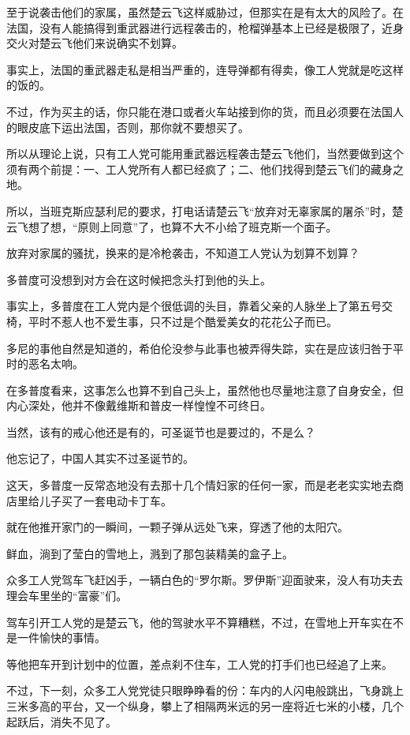 至于说袭击他们的家属，虽然楚云飞这样威胁过，但那实在是有太大的风险了。在法国，没有人能搞得到重武器进行远程袭击的，枪榴弹基本上已经是极限了，近身交火对楚云飞他们来说确实不划算。

事实上，法国的重武器走私是相当严重的，连导弹都有得卖，像工人党就是吃这样的饭的。

不过，作为买主的话，你只能在港口或者火车站接到你的货，而且必须要在法国人的眼皮底下运出法国，否则，那你就不要想买了。

所以从理论上说，只有工人党可能用重武器远程袭击楚云飞他们，当然要做到这个须有两个前提：一、工人党所有人都已经疯了；二、他们找得到楚云飞们的藏身之地。

所以，当班克斯应瑟利尼的要求，打电话请楚云飞“放弃对无辜家属的屠杀”时，楚云飞想了想，“原则上同意”了，也算不大不小给了班克斯一个面子。

放弃对家属的骚扰，换来的是冷枪袭击，不知道工人党认为划算不划算？

多普度可没想到对方会在这时候把念头打到他的头上。

事实上，多普度在工人党内是个很低调的头目，靠着父亲的人脉坐上了第五号交椅，平时不惹人也不爱生事，只不过是个酷爱美女的花花公子而已。

多尼的事他自然是知道的，希伯伦没参与此事也被弄得失踪，实在是应该归咎于平时的恶名太响。

在多普度看来，这事怎么也算不到自己头上，虽然他也尽量地注意了自身安全，但内心深处，他并不像戴维斯和普皮一样惶惶不可终日。

当然，该有的戒心他还是有的，可圣诞节也是要过的，不是么？

他忘记了，中国人其实不过圣诞节的。

这天，多普度一反常态地没有去那十几个情妇家的任何一家，而是老老实实地去商店里给儿子买了一套电动卡丁车。

就在他推开家门的一瞬间，一颗子弹从远处飞来，穿透了他的太阳穴。

鲜血，淌到了莹白的雪地上，溅到了那包装精美的盒子上。

众多工人党驾车飞赶凶手，一辆白色的“罗尔斯。罗伊斯”迎面驶来，没人有功夫去理会车里坐的“富豪”们。

驾车引开工人党的是楚云飞，他的驾驶水平不算糟糕，不过，在雪地上开车实在不是一件愉快的事情。

等他把车开到计划中的位置，差点刹不住车，工人党的打手们也已经追了上来。

不过，下一刻，众多工人党党徒只眼睁睁看的份：车内的人闪电般跳出，飞身跳上三米多高的平台，又一个纵身，攀上了相隔两米远的另一座将近七米的小楼，几个起跃后，消失不见了。

